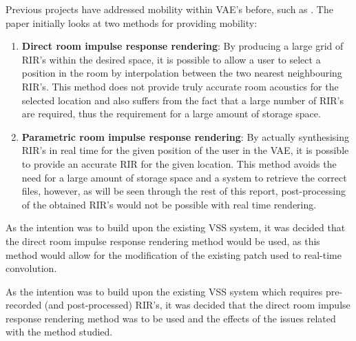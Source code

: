 \documentclass[../../main.tex]{subfiles}
\begin{document}
			Previous projects have addressed mobility within \ac{VAE}'s before, such as \cite{Savioja1999}. The paper initially looks at two methods for providing mobility:


			\begin{enumerate}

			 \item \textbf{Direct room impulse response rendering}: By producing a large grid of \ac{RIR}'s within the desired space, it is possible to allow a user to select a position in the room by interpolation between the two nearest neighbouring \ac{RIR}'s. This method does not provide truly accurate room acoustics for the selected location and also suffers from the fact that a large number of \ac{RIR}'s are required, thus the requirement for a large amount of storage space.

			\item \textbf{Parametric room impulse response rendering}: By actually synthesising \ac{RIR}'s in real time for the given position of the user in the \ac{VAE}, it is possible to provide an accurate \ac{RIR} for the given location. This method avoids the need for a large amount of storage space and a system to retrieve the correct files, however, as will be seen through the rest of this report, post-processing of the obtained {RIR}'s would not be possible with real time rendering.
			\end{enumerate}

			As the intention was to build upon the existing \ac{VSS} system, it was decided that the direct room impulse response rendering method would be used, as this method would allow for the modification of the existing patch used to real-time convolution.

			As the intention was to build upon the existing \ac{VSS} system which requires pre-recorded (and post-processed) \ac{RIR}'s, it was decided that the direct room impulse response rendering method was to be used and the effects of the issues related with the method studied.

\end{document}

